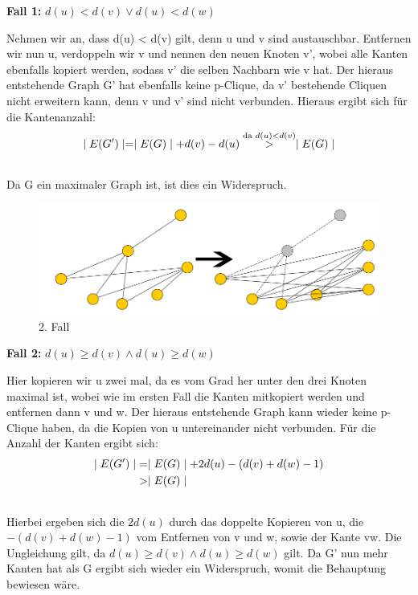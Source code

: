 \documentclass[12pt, a4paper]{article}
\begin{document}
\textbf{Fall 1:} $d(u) < d(v) \vee d(u) < d(w)$

Nehmen wir an, dass d(u) \textless{} d(v) gilt, denn u und v sind austauschbar.
Entfernen wir nun u, verdoppeln wir v und nennen den neuen Knoten v', wobei alle Kanten ebenfalls kopiert werden, sodass v' die selben Nachbarn wie v hat. Der hieraus entstehende Graph G' hat ebenfalls keine p-Clique, da v' bestehende Cliquen nicht erweitern kann, denn v und v' sind nicht verbunden. Hieraus ergibt sich für die Kantenanzahl:
\begin{gather}
\begin{split}\mid E(G') \mid = \mid E(G) \mid + d(v) - d(u) \overset{\text{da } d(u) < d(v)}{>} \mid E(G) \mid\end{split}\notag\\\begin{split}\end{split}\notag
\end{gather}
Da G ein maximaler Graph ist, ist dies ein Widerspruch.


\begin{figure}[H] 
		\centering
		\includegraphics[page=1, width=\textwidth]{assets/proof5-case2}
		\caption{2. Fall} 
\end{figure}

\textbf{Fall 2:} $d(u) \ge d(v) \wedge d(u) \ge d(w)$

Hier kopieren wir u zwei mal, da es vom Grad her unter den drei Knoten maximal ist, wobei wie im ersten Fall die Kanten mitkopiert werden und entfernen dann v und w. Der hieraus entstehende Graph kann wieder keine p-Clique haben, da die Kopien von u untereinander nicht verbunden. Für die Anzahl der Kanten ergibt sich:
\begin{gather}
\begin{split}\mid E(G') \mid &= \mid E(G) \mid + 2 d(u) - (d(v) + d(w) - 1) \\
&> \mid E(G) \mid\end{split}\notag\\\begin{split}\end{split}\notag
\end{gather}
Hierbei ergeben sich die $2d(u)$ durch das doppelte Kopieren von u, die $- (d(v) + d(w) - 1)$ vom Entfernen von v und w, sowie der Kante vw. Die Ungleichung gilt, da $d(u) \ge d(v) \wedge d(u) \ge d(w)$ gilt. Da G' nun mehr Kanten hat als G ergibt sich wieder ein Widerspruch, womit die Behauptung bewiesen wäre.
\end{document}
